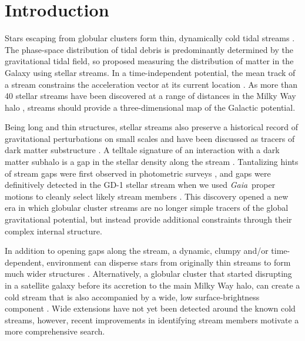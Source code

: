 \documentclass[twocolumn]{aastex62}
\newcommand{\gaia}{\textsl{Gaia}}
\begin{document}

\section{Introduction}
\label{sec:intro}
Stars escaping from globular clusters form thin, dynamically cold tidal streams \citep[e.g.,][]{combes1999}.
The phase-space distribution of tidal debris is predominantly determined by the gravitational tidal field, so \citet{johnston1999} proposed measuring the distribution of matter in the Galaxy using stellar streams.
In a time-independent potential, the mean track of a stream constrains the acceleration vector at its current location \citep{bh2018}.
As more than 40 stellar streams have been discovered at a range of distances in the Milky Way halo \citep[see][for a recent review]{gc2016}, streams should provide a three-dimensional map of the Galactic potential.

Being long and thin structures, stellar streams also preserve a historical record of gravitational perturbations on small scales and have been discussed as tracers of dark matter substructure \citep[e.g.,][]{johnston2002, carlberg2009}.
A telltale signature of an interaction with a dark matter subhalo is a gap in the stellar density along the stream \citep[e.g.,][]{ibata2002, yoon2011, eb2015}.
Tantalizing hints of stream gaps were first observed in photometric surveys \citep[e.g.,][]{carlberg2012,cg2013}, and gaps were definitively detected in the GD-1 stellar stream \citep{gd2006} when we used \gaia\ proper motions to cleanly select likely stream members \citep{pwb}.
This discovery opened a new era in which globular cluster streams are no longer simple tracers of the global gravitational potential, but instead provide additional constraints  through their complex internal structure.

In addition to opening gaps along the stream, a dynamic, clumpy and/or time-dependent, environment can disperse stars from originally thin streams to form much wider structures \citep[e.g.,][]{bonaca2014, ngan2016, pw2016, pearson2017}.
Alternatively, a globular cluster that started disrupting in a satellite galaxy before its accretion to the main Milky Way halo, can create a cold stream that is also accompanied by a wide, low surface-brightness component \citep{carlberg2018}.
Wide extensions have not yet been detected around the known cold streams, however, recent improvements in identifying stream members motivate a more comprehensive search.
\end{document}
